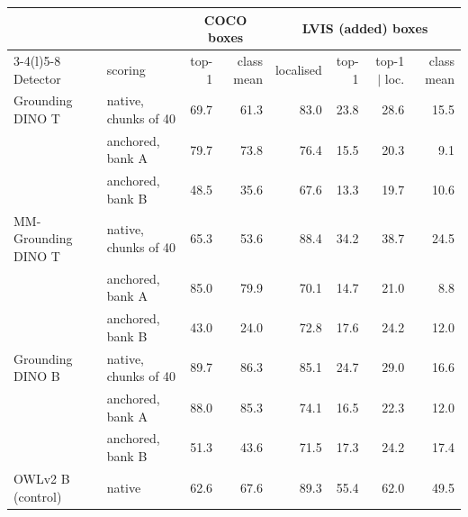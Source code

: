 \setlength{\tabcolsep}{4pt}\begin{tabular}{@{}llrrrrrr@{}}
\toprule
& & \multicolumn{2}{c}{COCO boxes} & \multicolumn{4}{c}{LVIS (added) boxes} \\ \cmidrule(lr){3-4}\cmidrule(l){5-8}
Detector & scoring & top-1 & class mean & localised & top-1 & top-1 $\mid$ loc. & class mean \\
\midrule
Grounding DINO T & native, chunks of 40 & 69.7 & 61.3 & 83.0 & 23.8 & 28.6 & 15.5 \\
 & anchored, bank A & 79.7 & 73.8 & 76.4 & 15.5 & 20.3 & 9.1 \\
 & anchored, bank B & 48.5 & 35.6 & 67.6 & 13.3 & 19.7 & 10.6 \\
\midrule
MM-Grounding DINO T & native, chunks of 40 & 65.3 & 53.6 & 88.4 & 34.2 & 38.7 & 24.5 \\
 & anchored, bank A & 85.0 & 79.9 & 70.1 & 14.7 & 21.0 & 8.8 \\
 & anchored, bank B & 43.0 & 24.0 & 72.8 & 17.6 & 24.2 & 12.0 \\
\midrule
Grounding DINO B & native, chunks of 40 & 89.7 & 86.3 & 85.1 & 24.7 & 29.0 & 16.6 \\
 & anchored, bank A & 88.0 & 85.3 & 74.1 & 16.5 & 22.3 & 12.0 \\
 & anchored, bank B & 51.3 & 43.6 & 71.5 & 17.3 & 24.2 & 17.4 \\
\midrule
OWLv2 B (control) & native & 62.6 & 67.6 & 89.3 & 55.4 & 62.0 & 49.5 \\
\bottomrule
\end{tabular}

